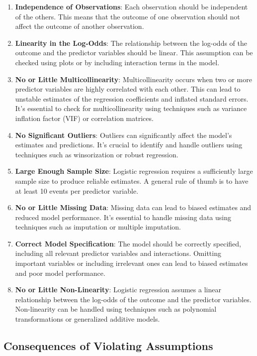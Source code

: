 \documentclass[12pt]{book}
\providecommand{\tightlist}{%
  \setlength{\itemsep}{0pt}\setlength{\parskip}{0pt}}
\begin{document}
\begin{enumerate}
\def\labelenumi{\arabic{enumi}.}
\tightlist
\item
  \textbf{Independence of Observations}: Each observation should be
  independent of the others. This means that the outcome of one
  observation should not affect the outcome of another observation.
\item
  \textbf{Linearity in the Log-Odds}: The relationship between the
  log-odds of the outcome and the predictor variables should be linear.
  This assumption can be checked using plots or by including interaction
  terms in the model.
\item
  \textbf{No or Little Multicollinearity}: Multicollinearity occurs when
  two or more predictor variables are highly correlated with each other.
  This can lead to unstable estimates of the regression coefficients and
  inflated standard errors. It's essential to check for
  multicollinearity using techniques such as variance inflation factor
  (VIF) or correlation matrices.
\item
  \textbf{No Significant Outliers}: Outliers can significantly affect
  the model's estimates and predictions. It's crucial to identify and
  handle outliers using techniques such as winsorization or robust
  regression.
\item
  \textbf{Large Enough Sample Size}: Logistic regression requires a
  sufficiently large sample size to produce reliable estimates. A
  general rule of thumb is to have at least 10 events per predictor
  variable.
\item
  \textbf{No or Little Missing Data}: Missing data can lead to biased
  estimates and reduced model performance. It's essential to handle
  missing data using techniques such as imputation or multiple
  imputation.
\item
  \textbf{Correct Model Specification}: The model should be correctly
  specified, including all relevant predictor variables and
  interactions. Omitting important variables or including irrelevant
  ones can lead to biased estimates and poor model performance.
\item
  \textbf{No or Little Non-Linearity}: Logistic regression assumes a
  linear relationship between the log-odds of the outcome and the
  predictor variables. Non-linearity can be handled using techniques
  such as polynomial transformations or generalized additive models.
\end{enumerate}

\subsection{\texorpdfstring{\textbf{Consequences of Violating
Assumptions}}{Consequences of Violating Assumptions}}\label{consequences-of-violating-assumptions}
\end{document}

